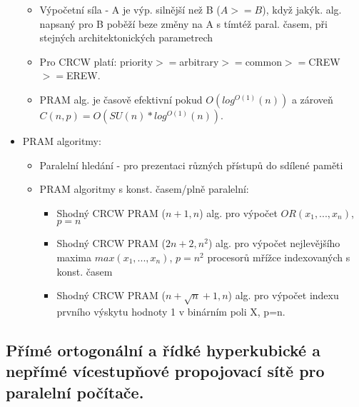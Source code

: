 \documentclass[a4paper,hidelinks]{article}
\begin{document}
\begin{itemize}
\begin{itemize}
        \item Výpočetní síla - A je výp. silnější než B ($A>=B$), když jakýk. alg. napsaný pro B poběží beze změny na A s tímtéž paral. časem, při stejných architektonických parametrech
        \item Pro CRCW platí: priority$>=$arbitrary$>=$common$>=$CREW$>=$EREW.
        \item PRAM alg. je časově efektivní pokud $O(log^{O(1)}(n))$ a zároveň $C(n,p)=O(SU(n)*log^{O(1)}(n))$.
    \end{itemize}
    \item PRAM algoritmy:
    \begin{itemize}
        \item Paralelní hledání - pro prezentaci různých přístupů do sdílené paměti
        \item PRAM algoritmy s konst. časem/plně paralelní:
        \begin{itemize}
            \item Shodný CRCW PRAM ($n+1,n$) alg. pro výpočet $OR(x_1,...,x_n)$, $p=n$
            \item Shodný CRCW PRAM ($2n+2,n^2$) alg. pro výpočet nejlevějšího maxima $max(x_1,...,x_n)$, $p=n^2$ procesorů mřížce indexovaných s konst. časem
            \item Shodný CRCW PRAM ($n+\sqrt{n}+1,n$) alg. pro výpočet indexu prvního výskytu hodnoty 1 v binárním poli X, p=n.
        \end{itemize}
    \end{itemize}
\end{itemize}


\subsection{Přímé ortogonální a řídké hyperkubické a nepřímé vícestupňové propojovací sítě pro paralelní počítače.}
\end{document}
